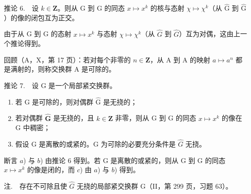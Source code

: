 推论 6.　设 \(k \in \mathbf{Z}\)。则从 G 到 G 的同态 \(x \mapsto x^k\) 的核与态射 \(\chi \mapsto \chi^k\)（从 \(\widehat{\mathrm{G}}\) 到 \(\widehat{\mathrm{G}}\)）的像的闭包互为正交。

由于从 G 到 G 的态射 \(x \mapsto x^{k}\) 与态射 \(\chi \mapsto \chi^{k}\)（从 \(\widehat{G}\) 到 \(\widehat{G}\)）互为对偶，这由上一个推论得到。

回顾（A，X，第 17 页）：若对每个非零的 \(n \in \mathbf{Z}\)，从 A 到 A 的映射 \(a \mapsto a^n\) 都是满射的，则称交换群 A 是可除的。

推论 7.　设 G 是一个局部紧交换群。

\begin{enumerate}
\def\labelenumi{\alph{enumi})}
\item
  若 G 是可除的，则对偶群 \(\widehat{\mathrm{G}}\) 是无挠的；
\item
  若对偶群 \(\widehat{\mathbf{G}}\) 是无挠的，且 \(k\in\mathbf{Z}\) 非零，则从 G 到 G 的同态 \(x\mapsto x^{k}\) 的像在 G 中稠密；
\item
  假设 G 是离散的或紧的。G 为可除的必要充分条件是 \(\widehat{G}\) 无挠。
\end{enumerate}

断言 \(a\)) 与 \(b\)) 由推论 6 得到。若 G 是离散的或紧的，则从 G 到 G 的同态 \(x \mapsto x^k\) 的像是闭的，而 \(c\)) 由 \(a\)) 与 \(b\)) 得到。

注.　存在不可除且使 \(\widehat{G}\) 无挠的局部紧交换群 G（II，第 299 页，习题 63）。

